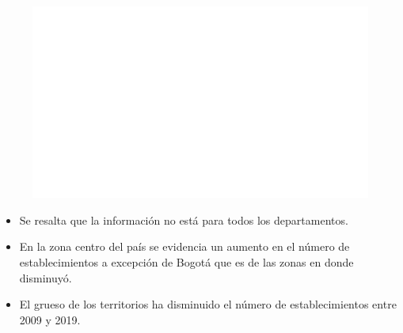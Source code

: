     \begin{figure}[H]
        \caption[Establecimientos por departamentos - Cambio porcentual entre 2009 y 2019 ]{\label{establecimientos_dptos_cambio} }
        \begin{center}
        \includegraphics[width=\textwidth,keepaspectratio]{img/var_217_map_change.png}
        \end{center}
    \end{figure}
            \begin{itemize}
                    \item Se resalta que la información no está para todos los departamentos.
                    \item En la zona centro del país se evidencia un aumento en el número de establecimientos a excepción de Bogotá que es de las zonas en donde disminuyó.
                    \item El grueso de los territorios ha disminuido el número de establecimientos entre 2009 y 2019.
                    \end{itemize}


